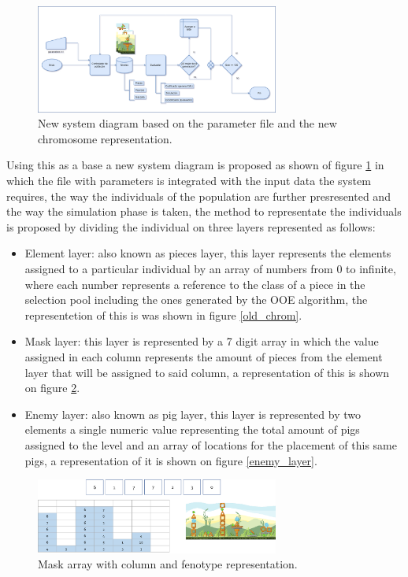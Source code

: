 \documentclass[conference]{IEEEtran}
\begin{document}
    \begin{figure}[htbp]
    \centerline{\includegraphics[width=80mm]{Images/new_model.png}}
    \caption{New system diagram based on the parameter file and the new chromosome representation.}
    \label{new_model}
    \end{figure}
    
    Using this as a base a new system diagram is proposed as shown of figure
    \ref{new_model} in which the file with parameters is integrated with the input
    data  the system requires, the way the individuals of the population are further
    presresented and the way the simulation phase is taken, the method to
    representate the individuals is proposed by dividing the individual on three
    layers represented as follows:
    
    \begin{itemize}
        \item Element layer: also known as pieces layer, this layer represents the
        elements assigned to a particular individual by an array of numbers from 0
        to infinite, where each number represents a reference to the class of a piece
        in the selection pool including the ones generated by the OOE algorithm, the
        representetion of this is was shown in figure \ref{old_chrom}.
        \item  Mask layer: this layer is represented by a 7 digit array in which the
        value assigned in each column represents the amount of pieces from the
        element layer that will be assigned to said column, a representation of this
        is shown on figure \ref{mask_layer}.
        \item Enemy layer: also known as pig layer, this layer is represented by two
        elements a single numeric value representing the total amount of pigs
        assigned to the level and an array of locations for the placement of this
        same pigs, a representation of it is shown on figure \ref{enemy_layer}. 
    \end{itemize}
    
    \begin{figure}[htbp]
        \centerline{\includegraphics[width=80mm]{Images/mask_layer.png}}
        \caption{Mask array with column and fenotype representation.}
        \label{mask_layer}
    \end{figure}
    
\end{document}
